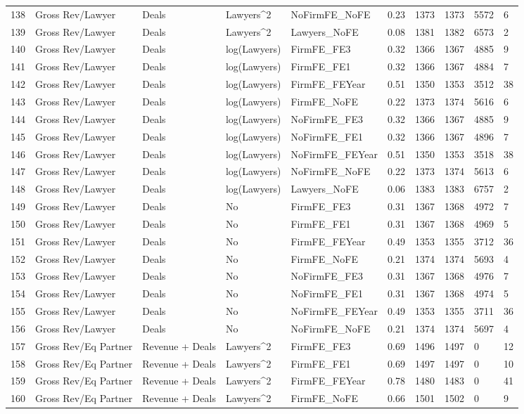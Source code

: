 \documentclass{article}
\begin{document}
\begin{table}[H]
\begin{tabular}{rlllllllll}
  138 & Gross Rev/Lawyer & Deals & Lawyers^2 & NoFirmFE\_NoFE & 0.23 & 1373 & 1373 & 5572 & 6 \\ 
  139 & Gross Rev/Lawyer & Deals & Lawyers^2 & Lawyers\_NoFE & 0.08 & 1381 & 1382 & 6573 & 2 \\ 
  140 & Gross Rev/Lawyer & Deals & log(Lawyers) & FirmFE\_FE3 & 0.32 & 1366 & 1367 & 4885 & 9 \\ 
  141 & Gross Rev/Lawyer & Deals & log(Lawyers) & FirmFE\_FE1 & 0.32 & 1366 & 1367 & 4884 & 7 \\ 
  142 & Gross Rev/Lawyer & Deals & log(Lawyers) & FirmFE\_FEYear & 0.51 & 1350 & 1353 & 3512 & 38 \\ 
  143 & Gross Rev/Lawyer & Deals & log(Lawyers) & FirmFE\_NoFE & 0.22 & 1373 & 1374 & 5616 & 6 \\ 
  144 & Gross Rev/Lawyer & Deals & log(Lawyers) & NoFirmFE\_FE3 & 0.32 & 1366 & 1367 & 4885 & 9 \\ 
  145 & Gross Rev/Lawyer & Deals & log(Lawyers) & NoFirmFE\_FE1 & 0.32 & 1366 & 1367 & 4896 & 7 \\ 
  146 & Gross Rev/Lawyer & Deals & log(Lawyers) & NoFirmFE\_FEYear & 0.51 & 1350 & 1353 & 3518 & 38 \\ 
  147 & Gross Rev/Lawyer & Deals & log(Lawyers) & NoFirmFE\_NoFE & 0.22 & 1373 & 1374 & 5613 & 6 \\ 
  148 & Gross Rev/Lawyer & Deals & log(Lawyers) & Lawyers\_NoFE & 0.06 & 1383 & 1383 & 6757 & 2 \\ 
  149 & Gross Rev/Lawyer & Deals & No & FirmFE\_FE3 & 0.31 & 1367 & 1368 & 4972 & 7 \\ 
  150 & Gross Rev/Lawyer & Deals & No & FirmFE\_FE1 & 0.31 & 1367 & 1368 & 4969 & 5 \\ 
  151 & Gross Rev/Lawyer & Deals & No & FirmFE\_FEYear & 0.49 & 1353 & 1355 & 3712 & 36 \\ 
  152 & Gross Rev/Lawyer & Deals & No & FirmFE\_NoFE & 0.21 & 1374 & 1374 & 5693 & 4 \\ 
  153 & Gross Rev/Lawyer & Deals & No & NoFirmFE\_FE3 & 0.31 & 1367 & 1368 & 4976 & 7 \\ 
  154 & Gross Rev/Lawyer & Deals & No & NoFirmFE\_FE1 & 0.31 & 1367 & 1368 & 4974 & 5 \\ 
  155 & Gross Rev/Lawyer & Deals & No & NoFirmFE\_FEYear & 0.49 & 1353 & 1355 & 3711 & 36 \\ 
  156 & Gross Rev/Lawyer & Deals & No & NoFirmFE\_NoFE & 0.21 & 1374 & 1374 & 5697 & 4 \\ 
  157 & Gross Rev/Eq Partner & Revenue + Deals & Lawyers^2 & FirmFE\_FE3 & 0.69 & 1496 & 1497 & 0 & 12 \\ 
  158 & Gross Rev/Eq Partner & Revenue + Deals & Lawyers^2 & FirmFE\_FE1 & 0.69 & 1497 & 1497 & 0 & 10 \\ 
  159 & Gross Rev/Eq Partner & Revenue + Deals & Lawyers^2 & FirmFE\_FEYear & 0.78 & 1480 & 1483 & 0 & 41 \\ 
  160 & Gross Rev/Eq Partner & Revenue + Deals & Lawyers^2 & FirmFE\_NoFE & 0.66 & 1501 & 1502 & 0 & 9 \\ 
   \hline
\end{tabular}
\end{table}
\end{document}
